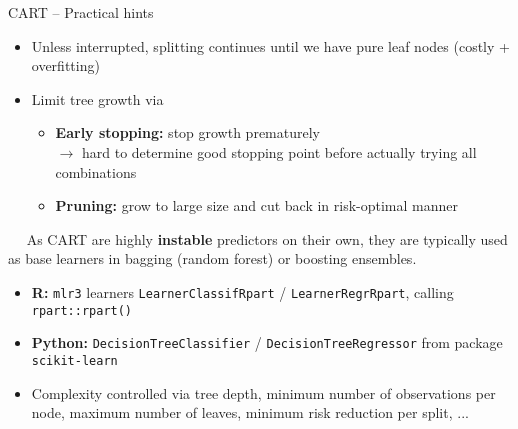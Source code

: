 \begin{frame}{CART -- Practical hints}

\footnotesize


\begin{itemize}
  \item Unless interrupted, splitting continues until we have pure
  leaf nodes (costly + overfitting)
  \item Limit tree growth via
  \begin{itemize}
    \item \textbf{Early stopping:} stop growth prematurely \\ $\rightarrow$ hard 
    to determine good stopping point before actually trying all combinations
    \item \textbf{Pruning:} grow to large size and cut back in risk-optimal 
    manner
  \end{itemize}
\end{itemize}

\medskip

 ~~ 
As CART are highly \textbf{instable} predictors on their own, they are typically 
used as base learners in bagging (random forest) or boosting ensembles.

\medskip

\begin{itemize}
  \item \textbf{R:} \texttt{mlr3} learners \texttt{LearnerClassifRpart} / 
    \texttt{LearnerRegrRpart}, calling \texttt{rpart::rpart()}
  \item \textbf{Python:} \texttt{DecisionTreeClassifier} / 
  \texttt{DecisionTreeRegressor} from package \texttt{scikit-learn}
  \item Complexity controlled via tree depth, minimum number of observations 
  per node, maximum number of leaves, minimum risk reduction per split, ...
\end{itemize}

\end{frame}
